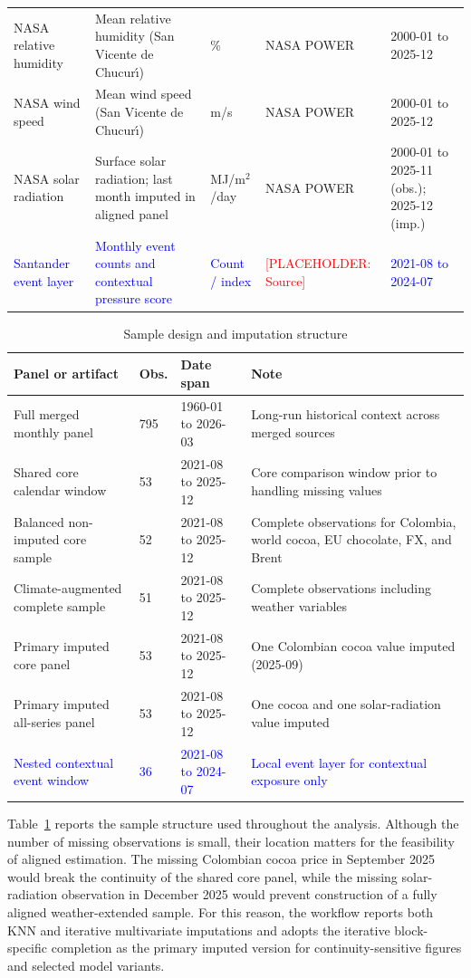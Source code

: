 \documentclass[11pt]{article}
\newcommand{\vTwo}[1]{\textcolor{blue}{#1}}
\newcommand{\placeholder}[1]{\textcolor{red}{[PLACEHOLDER: #1]}}
\begin{document}
\begin{longtable}{@{}p{2.6cm}p{3.6cm}p{1.4cm}p{2.2cm}p{2.8cm}@{}}
NASA relative humidity & Mean relative humidity (San Vicente de Chucur\'{\i}) & \% & NASA POWER & 2000-01 to 2025-12 \\
NASA wind speed & Mean wind speed (San Vicente de Chucur\'{\i}) & m/s & NASA POWER & 2000-01 to 2025-12 \\
NASA solar radiation & Surface solar radiation; last month imputed in aligned panel & MJ/m$^2$/day & NASA POWER & 2000-01 to 2025-11 (obs.); 2025-12 (imp.) \\
\vTwo{Santander event layer} & \vTwo{Monthly event counts and contextual pressure score} & \vTwo{Count / index} & \placeholder{Source} & \vTwo{2021-08 to 2024-07} \\
\bottomrule
\end{longtable}
\endgroup

\begin{table}[H]
\centering
\caption{Sample design and imputation structure}
\label{tab:sample_design}
\small
\setlength{\tabcolsep}{4pt}
\begin{tabular}{p{5.0cm}p{1.8cm}p{3.2cm}p{3.8cm}}
\toprule
Panel or artifact & Obs. & Date span & Note \\
\midrule
Full merged monthly panel & 795 & 1960-01 to 2026-03 & Long-run historical context across merged sources \\
Shared core calendar window & 53 & 2021-08 to 2025-12 & Core comparison window prior to handling missing values \\
Balanced non-imputed core sample & 52 & 2021-08 to 2025-12 & Complete observations for Colombia, world cocoa, EU chocolate, FX, and Brent \\
Climate-augmented complete sample & 51 & 2021-08 to 2025-12 & Complete observations including weather variables \\
Primary imputed core panel & 53 & 2021-08 to 2025-12 & One Colombian cocoa value imputed (2025-09) \\
Primary imputed all-series panel & 53 & 2021-08 to 2025-12 & One cocoa and one solar-radiation value imputed \\
\vTwo{Nested contextual event window} & \vTwo{36} & \vTwo{2021-08 to 2024-07} & \vTwo{Local event layer for contextual exposure only} \\
\bottomrule
\end{tabular}
\normalsize
\end{table}

Table~\ref{tab:sample_design} reports the sample structure used throughout the analysis. Although the number of missing observations is small, their location matters for the feasibility of aligned estimation. The missing Colombian cocoa price in September 2025 would break the continuity of the shared core panel, while the missing solar-radiation observation in December 2025 would prevent construction of a fully aligned weather-extended sample. For this reason, the workflow reports both KNN and iterative multivariate imputations and adopts the iterative block-specific completion as the primary imputed version for continuity-sensitive figures and selected model variants.
\end{document}
